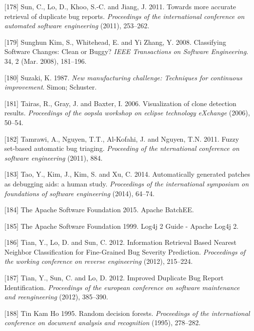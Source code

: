\documentclass[12pt]{report}
\begin{document}
\hypertarget{ref-Sun2011}{}
{[}178{]} Sun, C., Lo, D., Khoo, S.-C. and Jiang, J. 2011. Towards more
accurate retrieval of duplicate bug reports. \emph{Proceedings of the
international conference on automated software engineering} (2011),
253--262.

\hypertarget{ref-SunghunKim2008}{}
{[}179{]} Sunghun Kim, S., Whitehead, E. and Yi Zhang, Y. 2008.
Classifying Software Changes: Clean or Buggy? \emph{IEEE Transactions on
Software Engineering}. 34, 2 (Mar. 2008), 181--196.

\hypertarget{ref-suzaki1987new}{}
{[}180{]} Suzaki, K. 1987. \emph{New manufacturing challenge: Techniques
for continuous improvement}. Simon; Schuster.

\hypertarget{ref-Tairas2006a}{}
{[}181{]} Tairas, R., Gray, J. and Baxter, I. 2006. Visualization of
clone detection results. \emph{Proceedings of the oopsla workshop on
eclipse technology eXchange} (2006), 50--54.

\hypertarget{ref-Tamrawi2011a}{}
{[}182{]} Tamrawi, A., Nguyen, T.T., Al-Kofahi, J. and Nguyen, T.N.
2011. Fuzzy set-based automatic bug triaging. \emph{Proceeding of the
nternational conference on software engineering} (2011), 884.

\hypertarget{ref-tao2014automatically}{}
{[}183{]} Tao, Y., Kim, J., Kim, S. and Xu, C. 2014. Automatically
generated patches as debugging aids: a human study. \emph{Proceedings of
the international symposium on foundations of software engineering}
(2014), 64--74.

\hypertarget{ref-TheApacheSoftwareFoundation2015}{}
{[}184{]} The Apache Software Foundation 2015. Apache BatchEE.

\hypertarget{ref-TheApacheSoftwareFoundation1999}{}
{[}185{]} The Apache Software Foundation 1999. Log4j 2 Guide - Apache
Log4j 2.

\hypertarget{ref-Tian2012}{}
{[}186{]} Tian, Y., Lo, D. and Sun, C. 2012. Information Retrieval Based
Nearest Neighbor Classification for Fine-Grained Bug Severity
Prediction. \emph{Proceedings of the working conference on reverse
engineering} (2012), 215--224.

\hypertarget{ref-Tian2012a}{}
{[}187{]} Tian, Y., Sun, C. and Lo, D. 2012. Improved Duplicate Bug
Report Identification. \emph{Proceedings of the european conference on
software maintenance and reengineering} (2012), 385--390.

\hypertarget{ref-TinKamHo}{}
{[}188{]} Tin Kam Ho 1995. Random decision forests. \emph{Proceedings of
the international conference on document analysis and recognition}
(1995), 278--282.
\end{document}
